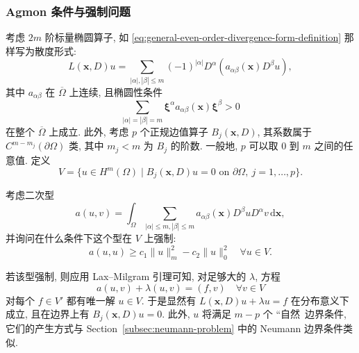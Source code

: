 \subsubsection{Agmon 条件与强制问题}\label{subsec:agmon-condition-coercive-problems}

考虑 $2m$ 阶标量椭圆算子, 如 \eqref{eq:general-even-order-divergence-form-definition} 那样写为散度形式:
\begin{equation}\label{eq:agmon-coercive-divergence-operator}
L(\bm{x},D)u=\sum_{|\alpha|,|\beta|\leq m}(-1)^{|\alpha|}D^\alpha(a_{\alpha\beta}(\bm{x})D^\beta u),
\end{equation}
其中 $a_{\alpha\beta}$ 在 $\overline\Omega$ 上连续, 且椭圆性条件
\begin{equation}\label{eq:agmon-principal-ellipticity-condition}
\sum_{|\alpha|=|\beta|=m}\bm{\xi}^\alpha a_{\alpha\beta}(\bm{x})\bm{\xi}^\beta>0
\end{equation}
在整个 $\overline\Omega$ 上成立. 此外, 考虑 $p$ 个正规边值算子 $B_j(\bm{x},D)$, 其系数属于 $C^{m-m_j}(\partial\Omega)$ 类, 其中 $m_j<m$ 为 $B_j$ 的阶数. 一般地, $p$ 可以取 $0$ 到 $m$ 之间的任意值. 定义
\begin{equation}\label{eq:agmon-essential-boundary-admissible-space}
V=\{u\in H^m(\Omega)\mid B_j(\bm{x},D)u=0\text{ on }\partial\Omega,\ j=1,\ldots,p\}.
\end{equation}


考虑二次型
\begin{equation}\label{eq:agmon-boundary-constrained-quadratic-form}
a(u,v)=\int_\Omega\sum_{|\alpha|\leq m,|\beta|\leq m}a_{\alpha\beta}(\bm{x})D^\beta uD^\alpha v\,\mathrm{d}\bm{x},
\end{equation}
并询问在什么条件下这个型在 $V$ 上强制:
\begin{equation}\label{eq:agmon-boundary-constrained-coercive-estimate}
a(u,u)\geq c_1\|u\|_m^2-c_2\|u\|_0^2\quad\forall u\in V.
\end{equation}


若该型强制, 则应用 Lax--Milgram 引理可知, 对足够大的 $\lambda$, 方程
\begin{equation}\label{eq:agmon-shifted-constrained-variational-equation}
a(u,v)+\lambda(u,v)=(f,v)\quad\forall v\in V
\end{equation}
对每个 $f\in V\prime$ 都有唯一解 $u\in V$. 于是显然有 $L(\bm{x},D)u+\lambda u=f$ 在分布意义下成立, 且在边界上有 $B_j(\bm{x},D)u=0$. 此外, $u$ 将满足 $m-p$ 个 ``自然\textquotesingle\textquotesingle\ 边界条件, 它们的产生方式与 Section~\ref{subsec:neumann-problem} 中的 Neumann 边界条件类似.

